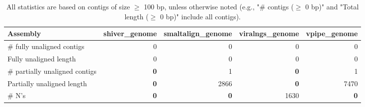 \documentclass[12pt,a4paper]{article}
\begin{document}
\begin{table}[ht]
\begin{center}
\caption{All statistics are based on contigs of size $\geq$ 100 bp, unless otherwise noted (e.g., "\# contigs ($\geq$ 0 bp)" and "Total length ($\geq$ 0 bp)" include all contigs).}
\begin{tabular}{|l*{4}{|r}|}
\hline
Assembly & shiver\_genome & smaltalign\_genome & viralngs\_genome & vpipe\_genome \\ \hline
\# fully unaligned contigs & 0 & 0 & 0 & 0 \\ \hline
Fully unaligned length & 0 & 0 & 0 & 0 \\ \hline
\# partially unaligned contigs & {\bf 0} & 1 & {\bf 0} & 1 \\ \hline
Partially unaligned length & {\bf 0} & 2866 & {\bf 0} & 7470 \\ \hline
\# N's & {\bf 0} & {\bf 0} & 1630 & {\bf 0} \\ \hline
\end{tabular}
\end{center}
\end{table}
\end{document}

